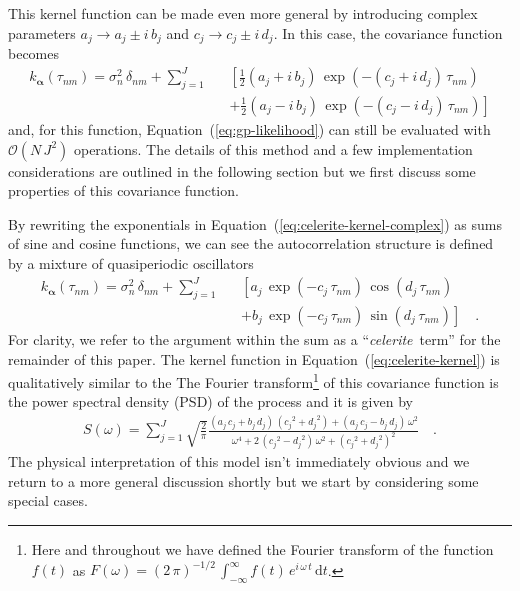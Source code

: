 \documentclass[manuscript, letterpaper]{aastex6}
\newcommand{\celeriteterm}{\emph{celerite}}
\renewcommand{\eqref}[1]{\ref{eq:#1}}
\newcommand{\Eq}[1]{Equation~(\eqref{#1})}
\newcommand{\eq}[1]{\Eq{#1}}
\newcommand{\eqlabel}[1]{\label{eq:#1}}
\newcommand{\dd}{\ensuremath{\,\mathrm{d}}}
\newcommand{\bvec}[1]{{\ensuremath{\boldsymbol{#1}}}}
\begin{document}
This kernel function can be made even more general by
introducing complex parameters $a_j \to a_j\pm i\,b_j$ and
$c_j \to c_j\pm i\,d_j$.
In this case, the covariance function becomes
\begin{eqnarray}\eqlabel{celerite-kernel-complex}
k_\bvec{\alpha}(\tau_{nm}) = \sigma_n^2\,\delta_{nm} +
    \sum_{j=1}^J &&\left[
    \frac{1}{2}(a_j + i\,b_j)\,\exp\left(-(c_j+i\,d_j)\,\tau_{nm}\right)
        \right. \nonumber\\
    &&+\left.
    \frac{1}{2}(a_j - i\,b_j)\,\exp\left(-(c_j-i\,d_j)\,\tau_{nm}\right)
\right]
\end{eqnarray}
and, for this function, \eq{gp-likelihood} can still be evaluated with
$\mathcal{O}(N\,J^2)$ operations.
The details of this method and a few implementation considerations are
outlined in the following section but we first discuss some
properties of this covariance function.

By rewriting the exponentials in \eq{celerite-kernel-complex} as sums of sine
and cosine functions, we can see the autocorrelation structure is defined by a
mixture of quasiperiodic oscillators
\begin{eqnarray}\eqlabel{celerite-kernel}
k_\bvec{\alpha}(\tau_{nm}) = \sigma_n^2\,\delta_{nm} +
    \sum_{j=1}^J &&\left[
    a_j\,\exp\left(-c_j\,\tau_{nm}\right)\,\cos\left(d_j\,\tau_{nm}\right)
        \right.\nonumber\\
    &&+ \left.
    b_j\,\exp\left(-c_j\,\tau_{nm}\right)\,\sin\left(d_j\,\tau_{nm}\right)
\right] \quad.
\end{eqnarray}
For clarity, we refer to the argument within the sum as a ``\celeriteterm\
term'' for the remainder of this paper.
The kernel function in \eq{celerite-kernel} is qualitatively similar to the
The Fourier transform\footnote{Here and throughout we have defined the Fourier
transform of the function $f(t)$ as $F(\omega)={(2\,\pi)}^{-1/2}\,
\int_{-\infty}^\infty f(t)\,e^{i\,\omega\,t}\dd t$.} of this covariance
function is the power spectral density (PSD) of the process and it is given by
\begin{eqnarray}\eqlabel{celerite-psd}
S(\omega) = \sum_{j=1}^J \sqrt{\frac{2}{\pi}}
\frac{(a_j\,c_j+b_j\,d_j)\,({c_j}^2+{d_j}^2)+(a_j\,c_j-b_j\,d_j)\,\omega^2}
{\omega^4+2\,({c_j}^2-{d_j}^2)\,\omega^2+{({c_j}^2+{d_j}^2)}^2}\quad.
\end{eqnarray}
The physical interpretation of this model isn't immediately obvious and we
return to a more general discussion shortly but we start by considering some
special cases.
\end{document}
